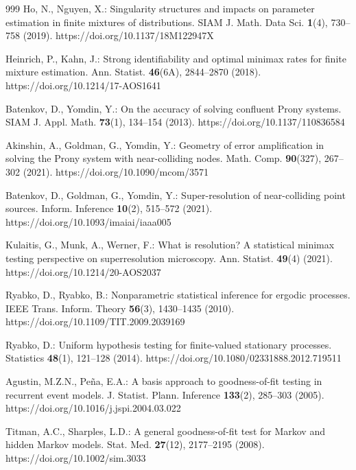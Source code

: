 \begin{thebibliography}{999}
Ho, N., Nguyen, X.: Singularity structures and impacts on parameter estimation
in finite mixtures of distributions. SIAM J. Math. Data Sci. \textbf{1}(4),
730--758 (2019). https://doi.org/10.1137/18M122947X

Heinrich, P., Kahn, J.: Strong identifiability and optimal minimax rates for
finite mixture estimation. Ann. Statist. \textbf{46}(6A), 2844--2870 (2018).
https://doi.org/10.1214/17-AOS1641

Batenkov, D., Yomdin, Y.: On the accuracy of solving confluent Prony systems.
SIAM J. Appl. Math. \textbf{73}(1), 134--154 (2013).
https://doi.org/10.1137/110836584

Akinshin, A., Goldman, G., Yomdin, Y.: Geometry of error amplification in
solving the Prony system with near-colliding nodes. Math. Comp.
\textbf{90}(327), 267--302 (2021). https://doi.org/10.1090/mcom/3571

Batenkov, D., Goldman, G., Yomdin, Y.: Super-resolution of near-colliding
point sources. Inform. Inference \textbf{10}(2), 515--572 (2021).
https://doi.org/10.1093/imaiai/iaaa005

Kulaitis, G., Munk, A., Werner, F.: What is resolution? A statistical minimax
testing perspective on superresolution microscopy. Ann. Statist.
\textbf{49}(4) (2021). https://doi.org/10.1214/20-AOS2037

Ryabko, D., Ryabko, B.: Nonparametric statistical inference for ergodic
processes. IEEE Trans. Inform. Theory \textbf{56}(3), 1430--1435 (2010).
https://doi.org/10.1109/TIT.2009.2039169

Ryabko, D.: Uniform hypothesis testing for finite-valued stationary processes.
Statistics \textbf{48}(1), 121--128 (2014).
https://doi.org/10.1080/02331888.2012.719511

Agustin, M.Z.N., Pe\~na, E.A.: A basis approach to goodness-of-fit testing in
recurrent event models. J. Statist. Plann. Inference \textbf{133}(2), 285--303
(2005). https://doi.org/10.1016/j.jspi.2004.03.022

Titman, A.C., Sharples, L.D.: A general goodness-of-fit test for Markov and
hidden Markov models. Stat. Med. \textbf{27}(12), 2177--2195 (2008).
https://doi.org/10.1002/sim.3033


\end{thebibliography}
